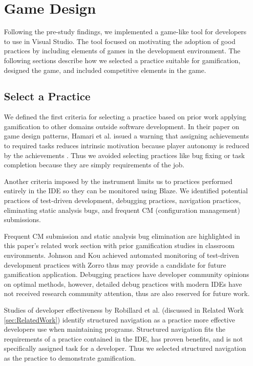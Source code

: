 \documentclass{sig-alternate}
\begin{document}
\section{Game Design}


Following the pre-study findings, we implemented a game-like tool for developers to use in Visual Studio.  The tool focused on motivating the adoption of good practices by including elements of games in the development environment.  The following sections describe how we selected a practice suitable for gamification, designed the game, and included competitive elements in the game.

\subsection{Select a Practice}

We defined the first criteria for selecting a practice based on prior work  applying gamification to other domains outside software development. 
In their paper on game design patterns, Hamari et al. issued a warning that assigning achievements to required tasks reduces intrinsic motivation because player autonomy is reduced by the achievements \cite{wbsnipes:Hamari2011Framework}.  Thus we avoided selecting practices like bug fixing or task completion because they are simply requirements of the job.  

Another criteria imposed by the instrument limits us to practices performed entirely in the IDE so they can be monitored using Blaze.  We identified potential practices of test-driven development, debugging practices, navigation practices,  eliminating static analysis bugs, and frequent CM (configuration management) submissions.  

Frequent CM submission and static analysis bug elimination are highlighted in this paper's related work section with prior gamification studies in classroom environments.  Johnson and Kou achieved automated monitoring of test-driven development practices with Zorro \cite{V:Johnson2007Automated} thus may provide a candidate for future gamification application.   
Debugging practices have developer community opinions on optimal methods, however, detailed debug practices with modern IDEs have not received research community attention, thus are also reserved for future work.  

Studies of developer effectiveness by Robillard et al.\cite{wbsnipes:Robillard2004How} (discussed in Related Work \ref{sec:RelatedWork}) identify structured navigation as a practice more effective developers use when maintaining programs.  Structured navigation fits the requirements of a practice contained in the IDE, has proven benefits, and is not specifically assigned task for a developer.  Thus we selected structured navigation as the practice to demonstrate gamification.
\end{document}
